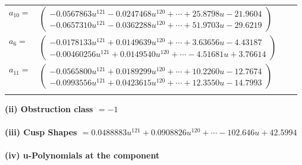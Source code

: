 \documentclass[1p]{elsarticle_modified}
\theoremstyle{definition}
\begin{document}
\begin{tabular}{m{7pt} m{180pt} m{7pt} m{180pt} }
\flushright $a_{10}=$&$\begin{pmatrix}-0.0567863 u^{121}-0.0247468 u^{120}+\cdots+25.8798 u-21.9604\\-0.0657310 u^{121}-0.0362288 u^{120}+\cdots+51.9703 u-29.6219\end{pmatrix}$ \\
\flushright $a_{6}=$&$\begin{pmatrix}-0.0178133 u^{121}+0.0149639 u^{120}+\cdots+3.63656 u-4.43187\\-0.00460256 u^{121}+0.0149540 u^{120}+\cdots-4.51681 u+3.76614\end{pmatrix}$ \\
\flushright $a_{11}=$&$\begin{pmatrix}-0.0565800 u^{121}+0.0189299 u^{120}+\cdots+10.2260 u-12.7674\\-0.0993556 u^{121}+0.0423615 u^{120}+\cdots+12.3550 u-14.7993\end{pmatrix}$\\&\end{tabular}
\flushleft \textbf{(ii) Obstruction class $= -1$}\\~\\
\flushleft \textbf{(iii) Cusp Shapes $= 0.0488883 u^{121}+0.0908826 u^{120}+\cdots-102.646 u+42.5994$}\\~\\
\newpage\renewcommand{\arraystretch}{1}
\flushleft \textbf{(iv) u-Polynomials at the component}\newline \\
\end{document}
